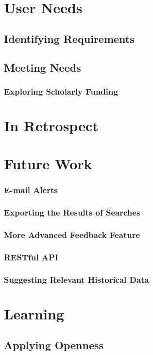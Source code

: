 \section{User Needs}
\subsection{Identifying Requirements}
\subsection{Meeting Needs}
\subsubsection{Exploring Scholarly Funding}
\section{In Retrospect}
\section{Future Work}
\subsubsection{E-mail Alerts}
\subsubsection{Exporting the Results of Searches}
\subsubsection{More Advanced Feedback Feature}
\subsubsection{RESTful API}
\subsubsection{Suggesting Relevant Historical Data}
\section{Learning}
\subsection{Applying Openness}
